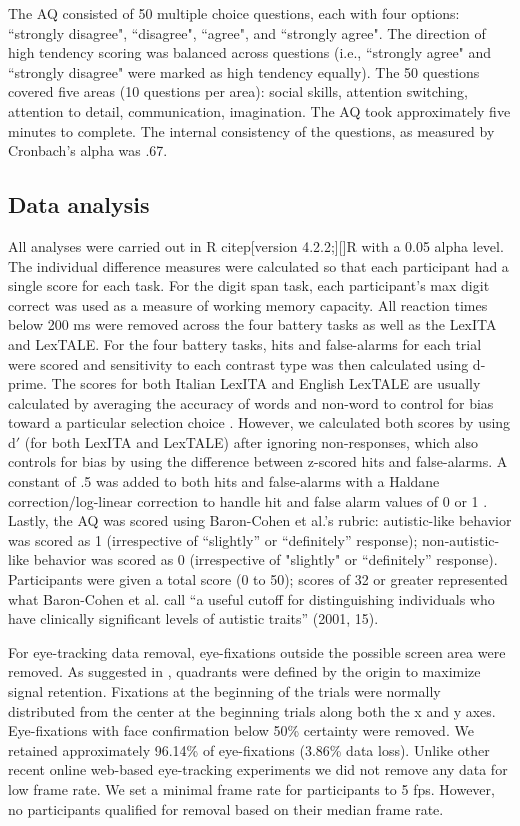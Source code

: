 The AQ  consisted of 50 multiple choice questions, each with four options: ``strongly disagree", ``disagree", ``agree", and ``strongly agree". The direction of high tendency scoring was balanced across questions (i.e., ``strongly agree" and ``strongly disagree" were marked as high tendency equally). The 50 questions covered five areas (10 questions per area): social skills, attention switching, attention to detail, communication, imagination. The AQ took approximately five minutes to complete. The internal consistency of the questions, as measured by Cronbach’s alpha was .67.


\subsection{Data analysis}

All analyses were carried out in R citep[version 4.2.2;][]{R} with a 0.05 alpha level. The individual difference measures were calculated so that each participant had a single score for each task. For the digit span task, each participant's max digit correct was used as a measure of working memory capacity. All reaction times below 200 ms were removed across the four battery tasks as well as the LexITA and LexTALE. For the four battery tasks, hits and false-alarms for each trial were scored and sensitivity to each contrast type was then calculated using d-prime. The scores for both Italian LexITA and English LexTALE are usually calculated by averaging the accuracy of words and non-word to control for bias toward a particular selection choice . However, we calculated both scores by using d$'$ (for both LexITA and LexTALE) after ignoring non-responses, which also controls for bias by using the difference between z-scored hits and false-alarms. A constant of .5 was added to both hits and false-alarms with a Haldane correction/log-linear correction to handle hit and false alarm values of 0 or 1 . Lastly, the AQ was scored using Baron-Cohen et al.'s rubric: autistic-like behavior was scored as 1 (irrespective of “slightly” or “definitely” response); non-autistic-like behavior was scored as 0 (irrespective of "slightly" or “definitely” response). Participants were given a total score (0 to 50); scores of 32 or greater represented what Baron-Cohen et al. call “a useful cutoff for distinguishing individuals who have clinically significant levels of autistic traits” (2001, 15). 

For eye-tracking data removal, eye-fixations outside the possible screen area were removed. As suggested in \cite{bramlett_wiener_24-AOW}, quadrants were defined by the origin to maximize signal retention. Fixations at the beginning of the trials were normally distributed from the center at the beginning trials along both the x and y axes. Eye-fixations with face confirmation below 50\% certainty were removed. We retained approximately 96.14\% of eye-fixations (3.86\% data loss). Unlike other recent online web-based eye-tracking experiments we did not remove any data for low frame rate. We set a minimal frame rate for participants to 5 fps. However, no participants qualified for removal based on their median frame rate. 

